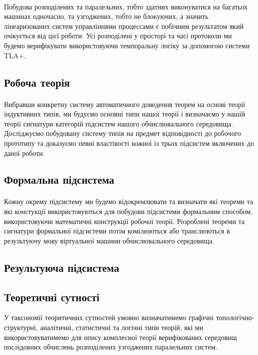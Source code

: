 \documentclass[11pt,oneside]{article}
\begin{document}
   \paragraph{}
   Побудова розподілених та паралельних, тобто здатних виконуватися на багатьох машинах одночасно, та
   узгоджених, тобто не блокуючих, а значить лінеаризованих систем управліннями процессами є побічним
   результатом який очікується від цієї роботи. Усі розподілені у просторі та часі
   протоколи ми будемо верифікувати використовуючи темпоральну логіку за допомогою системи TLA+.

\subsection*{Робоча теорія}

   \paragraph{}
   Вибравши конкретну систему автоматичного доведення теорем на основі теорії індуктивних типів,
   ми будуємо основні типи нашої теорії і визначаємо у нашій теорії сигнатури категорій підсистем
   нашого обчислювального середовища. Досліджуємо побудовану систему типів на предмет
   відповідності до робочого прототипу та доказуємо певні властівості кожної із трьох
   підсистем включених до даної роботи.

\subsection*{Формальна підсистема}

   \paragraph{}
   Кожну окрему підсистему ми будемо відокремлювати та визначати які теореми
   та які констукції використовуються для побудови підсистеми формальним способом,
   використовуючи математичні конструкції робочої теорії. Розроблені теореми та сигнатури
   формальної підсистеми потім комілюються або транслюються в результуючу мову віртуальної машини
   обчислювального середовища.

\subsection*{Результуюча підсистема}

\newpage
\subsection{Теоретичні сутності}
\vspace{0.5cm}
   У таксономії теоритичних сутностей умовно визначатимемо
   графічні топологічно- структурні, аналітичні, статистичні та логічні типи теорій, які
   ми використовуватимемо для опису комплесної теорії верифікованих середовищ
   послідовних обчислень розподілених узгоджених паралельних систем.\\
\end{document}
